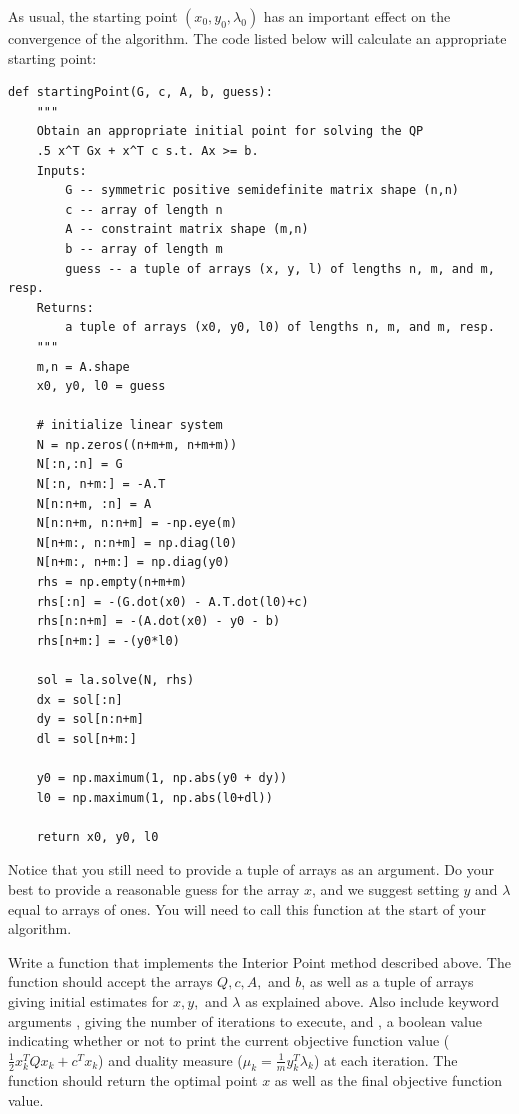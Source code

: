 As usual, the starting point $(x_0, y_0, \lambda_0)$ has an important effect on the convergence of the algorithm.
The code listed below will calculate an appropriate starting point:
\begin{lstlisting}
def startingPoint(G, c, A, b, guess):
    """
    Obtain an appropriate initial point for solving the QP
    .5 x^T Gx + x^T c s.t. Ax >= b.
    Inputs:
        G -- symmetric positive semidefinite matrix shape (n,n)
        c -- array of length n
        A -- constraint matrix shape (m,n)
        b -- array of length m
        guess -- a tuple of arrays (x, y, l) of lengths n, m, and m, resp.
    Returns:
        a tuple of arrays (x0, y0, l0) of lengths n, m, and m, resp.
    """
    m,n = A.shape
    x0, y0, l0 = guess

    # initialize linear system
    N = np.zeros((n+m+m, n+m+m))
    N[:n,:n] = G
    N[:n, n+m:] = -A.T
    N[n:n+m, :n] = A
    N[n:n+m, n:n+m] = -np.eye(m)
    N[n+m:, n:n+m] = np.diag(l0)
    N[n+m:, n+m:] = np.diag(y0)
    rhs = np.empty(n+m+m)
    rhs[:n] = -(G.dot(x0) - A.T.dot(l0)+c)
    rhs[n:n+m] = -(A.dot(x0) - y0 - b)
    rhs[n+m:] = -(y0*l0)

    sol = la.solve(N, rhs)
    dx = sol[:n]
    dy = sol[n:n+m]
    dl = sol[n+m:]

    y0 = np.maximum(1, np.abs(y0 + dy))
    l0 = np.maximum(1, np.abs(l0+dl))

    return x0, y0, l0
\end{lstlisting}
Notice that you still need to provide a tuple of arrays  as an argument.
Do your best to provide a reasonable guess for the array $x$, and we suggest setting $y$ and $\lambda$
equal to arrays of ones. You will need to call this function at the start of your algorithm.

\begin{problem}
Write a function  that implements the Interior Point method described above.
The function should accept the arrays $Q, c, A,$ and $b$, as well as a tuple of arrays 
giving initial estimates for $x, y,$ and $\lambda$ as explained above. Also include keyword
arguments , giving the number of iterations to execute, and , a boolean value
indicating whether or not to print the current objective function value ($ \frac{1}{2}x_k^TQx_k + c^Tx_k$) and duality measure ($\mu_k = \frac{1}{m}y_k^T\lambda_k$) at each
iteration. The function should return the optimal point $x$ as well as the final objective function value.
\end{problem}

